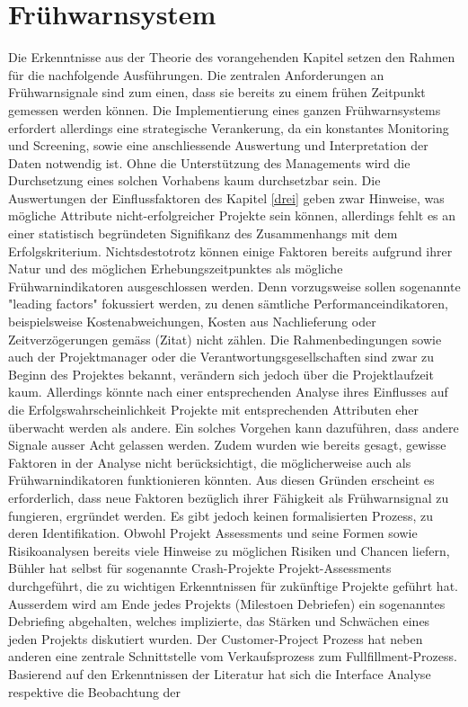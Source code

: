 \section{Frühwarnsystem}\label{sec:diskfru}
Die Erkenntnisse aus der Theorie des vorangehenden Kapitel setzen den Rahmen für die nachfolgende Ausführungen. Die zentralen Anforderungen an Frühwarnsignale sind zum einen, dass sie bereits zu einem frühen Zeitpunkt gemessen werden können. Die Implementierung eines ganzen Frühwarnsystems erfordert allerdings eine strategische Verankerung, da ein konstantes Monitoring und Screening, sowie eine anschliessende Auswertung und Interpretation der Daten notwendig ist. Ohne die Unterstützung des Managements wird die Durchsetzung eines solchen Vorhabens kaum durchsetzbar sein.
Die Auswertungen der Einflussfaktoren des Kapitel \ref{drei} geben zwar Hinweise, was mögliche Attribute nicht-erfolgreicher Projekte sein können, allerdings fehlt es an einer statistisch begründeten Signifikanz des Zusammenhangs mit dem Erfolgskriterium. Nichtsdestotrotz können einige Faktoren bereits aufgrund ihrer Natur und des möglichen Erhebungszeitpunktes als mögliche Frühwarnindikatoren ausgeschlossen werden. Denn vorzugsweise sollen sogenannte "leading factors" fokussiert werden, zu denen sämtliche Performanceindikatoren, beispielsweise Kostenabweichungen, Kosten aus Nachlieferung oder Zeitverzögerungen gemäss (Zitat) nicht zählen. Die Rahmenbedingungen sowie auch der Projektmanager oder die Verantwortungsgesellschaften sind zwar zu Beginn des Projektes bekannt, verändern sich jedoch über die Projektlaufzeit kaum. Allerdings könnte nach einer entsprechenden Analyse ihres Einflusses auf die Erfolgswahrscheinlichkeit Projekte mit entsprechenden Attributen eher überwacht werden als andere. Ein solches Vorgehen kann dazuführen, dass andere Signale ausser Acht gelassen werden. Zudem wurden wie bereits gesagt, gewisse Faktoren in der Analyse nicht berücksichtigt, die möglicherweise auch als Frühwarnindikatoren funktionieren könnten. Aus diesen Gründen erscheint es erforderlich, dass neue Faktoren bezüglich ihrer Fähigkeit als Frühwarnsignal zu fungieren, ergründet werden. Es gibt jedoch keinen formalisierten Prozess, zu deren Identifikation. 
\newline Obwohl Projekt Assessments und seine Formen sowie Risikoanalysen bereits viele Hinweise zu möglichen Risiken und Chancen liefern, 
Bühler hat selbst für sogenannte Crash-Projekte Projekt-Assessments durchgeführt, die zu wichtigen Erkenntnissen für zukünftige Projekte geführt hat. Ausserdem wird am Ende jedes Projekts (Milestoen Debriefen) ein sogenanntes Debriefing abgehalten, welches implizierte, das Stärken und Schwächen eines jeden Projekts diskutiert wurden. Der Customer-Project Prozess hat neben anderen eine zentrale Schnittstelle vom Verkaufsprozess zum Fullfillment-Prozess. Basierend auf den Erkenntnissen der Literatur hat sich die Interface Analyse respektive die Beobachtung der
